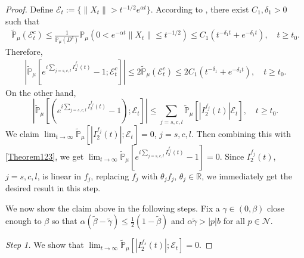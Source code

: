 \documentclass[12pt,a4paper]{amsart}
\theoremstyle{plain}
\theoremstyle{definition}
\numberwithin{equation}{section}
\begin{document}
\begin{proof}
 Define $\mathcal{E}_t:=\{\|X_t\|>t^{-1/2}e^{\alpha t}\}$. According to
 \cite[Proposition 2.10]{RenSongSunZhao2019Stable}, there exist $C_1, \delta_1>0$ such that
  \begin{align}
    \mathbb{\widetilde{P}}_{\mu}(\mathcal{E}^c_t)
    \leq \frac{1}{\mathbb{P}_{\mu}(D^c)}\mathbb{P}_{\mu}(0<e^{-\alpha t}\|X_t\|\leq t^{-1/2})\leq C_1(t^{-\delta_1 t}+e^{-\delta_1 t})
    , \quad t\geq t_0.
  \end{align}
  Therefore,
  \begin{align}
    \label{Theorem123}
    |\mathbb{\widetilde{P}}_{\mu}[e^{i
    \sum_{j=s,c,l}I^{f_j}_2(t)}-1;\mathcal{E}^c_t]|
    \leq 2\mathbb{\widetilde{P}}_{\mu}(\mathcal{E}^c_t)
    \leq 2C_1(t^{-\delta_1}+e^{-\delta_1 t}),
    \quad t\geq t_0.
  \end{align}
On the other hand,
\[
   |\mathbb{\widetilde{P}}_{\mu} [ (e^{i
      \sum_{j=s,c,l}I^{f_j}_2(t)}-1);\mathcal{E}_t]|
    \leq \sum_{j=s,c,l}\widetilde{\mathbb P}_{\mu}[|I^{f_j}_2(t)|\mathcal{E}_t],
\quad t\geq t_0.
\]
We claim  $\lim_{t\rightarrow \infty}\widetilde{\mathbb P}_{\mu}[|I^{f_j}_2(t)|;\mathcal{E}_t]=0$, $j=s,c,l$. Then combining this with \eqref{Theorem123}, we get $\lim_{t\rightarrow \infty}\mathbb{\widetilde{P}}_{\mu}[e^{i \sum_{j=s,c,l}I^{f_j}_2(t)}-1] = 0$.
Since $I_2^{f_j}(t)$, $j=s,c,l$, is linear in $f_j$, replacing $f_j$ with $\theta_j f_j$, $\theta_j \in \mathbb R$, we immediately get the desired result in this step.

   We now show the claim above in the following steps.
Fix a $\gamma \in (0,\beta)$ close enough to $\beta$ so that $\alpha(\tilde{\beta}-\tilde{\gamma})\leq \frac{1}{2}(1-\tilde{\beta})$ and $\alpha\tilde{\gamma}>|p|b$ for all $p\in \mathcal N$.

\emph{Step 1.} We show that $\lim_{t\rightarrow \infty}\widetilde{\mathbb P}_{\mu}[|I^{f_s}_2(t)|;\mathcal{E}_t]=0$.


\end{proof}
\end{document}
